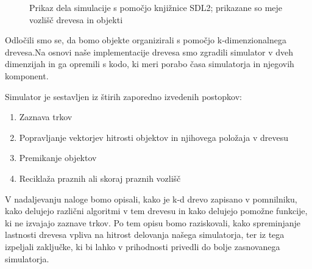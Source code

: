 \documentclass[a4paper,12pt]{article}
\begin{document}
\begin{figure}
    \centering
    \caption{Prikaz dela simulacije s pomočjo knjižnice SDL2; prikazane so meje vozlišč drevesa in objekti}
\end{figure}



Odločili smo se, da bomo objekte organizirali s pomočjo k-dimenzionalnega drevesa.\@ Na osnovi naše implementacije drevesa
smo zgradili simulator v dveh dimenzijah in ga opremili s kodo, ki meri porabo časa simulatorja in njegovih
komponent.

Simulator je sestavljen iz štirih zaporedno izvedenih postopkov:
\begin{enumerate}
    \item Zaznava trkov
    \item Popravljanje vektorjev hitrosti objektov in njihovega položaja v drevesu
    \item Premikanje objektov
    \item Reciklaža praznih ali skoraj praznih vozlišč
\end{enumerate}

V nadaljevanju naloge bomo opisali, kako je k-d drevo zapisano v pomnilniku, kako delujejo različni
algoritmi v tem drevesu in kako delujejo pomožne funkcije, ki ne izvajajo zaznave trkov. Po tem opisu
bomo raziskovali, kako spreminjanje lastnosti drevesa vpliva na hitrost delovanja našega simulatorja,
ter iz tega izpeljali zaključke, ki bi lahko v prihodnosti privedli do bolje zasnovanega simulatorja.
\end{document}
